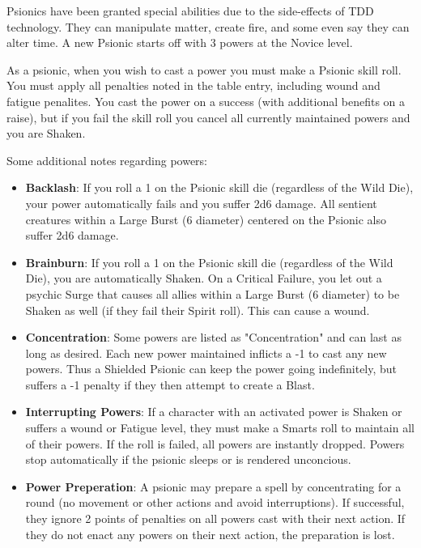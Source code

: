 \documentclass[10pt,twoside]{article}
\begin{document}
  \begin{multicols}{2}

  Psionics have been granted special abilities due to the side-effects of TDD technology. They can manipulate matter, create fire, and some even say they can alter time. A new Psionic starts off with 3 powers at the Novice level.

  As a psionic, when you wish to cast a power you must make a Psionic skill roll. You must apply all penalties noted in the table entry, including wound and fatigue penalites. You cast the power on a success (with additional benefits on a raise), but if you fail the skill roll you cancel all currently maintained powers and you are Shaken.

  Some additional notes regarding powers:

  \begin{itemize}

    \item \textbf{Backlash}: If you roll a 1 on the Psionic skill die (regardless of the Wild Die), your power automatically fails and you suffer 2d6 damage. All sentient creatures within a Large Burst (6 diameter) centered on the Psionic also suffer 2d6 damage.

    \item \textbf{Brainburn}: If you roll a 1 on the Psionic skill die (regardless of the Wild Die), you are automatically Shaken. On a Critical Failure, you let out a psychic Surge that causes all allies within a Large Burst (6 diameter) to be Shaken as well (if they fail their Spirit roll). This can cause a wound.

    \item \textbf{Concentration}: Some powers are listed as "Concentration" and can last as long as desired. Each new power maintained inflicts a -1 to cast any new powers. Thus a Shielded Psionic can keep the power going indefinitely, but suffers a -1 penalty if they then attempt to create a Blast.

    \item \textbf{Interrupting Powers}: If a character with an activated power is Shaken or suffers a wound or Fatigue level, they must make a Smarts roll to maintain all of their powers. If the roll is failed, all powers are instantly dropped. Powers stop automatically if the psionic sleeps or is rendered unconcious.

    \item \textbf{Power Preperation}: A psionic may prepare a spell by concentrating for a round (no movement or other actions and avoid interruptions). If successful, they ignore 2 points of penalties on all powers cast with their next action. If they do not enact any powers on their next action, the preparation is lost.

  \end{itemize}

  \end{multicols}
\end{document}
